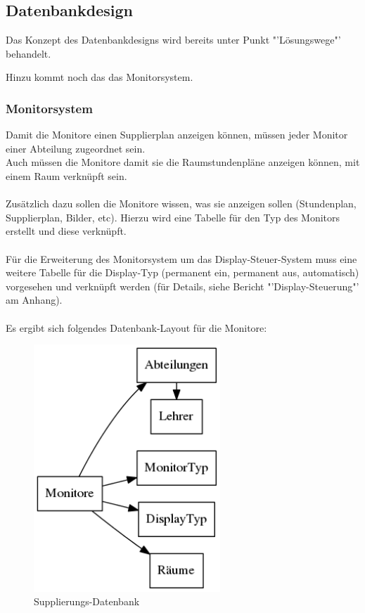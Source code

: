 \subsection{Datenbankdesign}

Das Konzept des Datenbankdesigns wird bereits unter Punkt "'Lösungswege"' behandelt.

Hinzu kommt noch das das Monitorsystem.

\subsubsection{Monitorsystem}

Damit die Monitore einen Supplierplan anzeigen können, müssen jeder Monitor einer Abteilung zugeordnet sein.\\
Auch müssen die Monitore damit sie die Raumstundenpläne anzeigen können, mit einem Raum verknüpft sein.\\
\\
Zusätzlich dazu sollen die Monitore wissen, was sie anzeigen sollen (Stundenplan, Supplierplan, Bilder, etc). Hierzu wird eine Tabelle für den Typ des Monitors erstellt und diese verknüpft.\\
\\ 
Für die Erweiterung des Monitorsystem um das Display-Steuer-System muss eine weitere Tabelle für die Display-Typ (permanent ein, permanent aus, automatisch) vorgesehen und verknüpft werden (für Details, siehe Bericht "'Display-Steuerung"' am Anhang).\\
\\
Es ergibt sich folgendes Datenbank-Layout für die Monitore:
\begin{figure}[H]
\centering
\includegraphics[keepaspectratio=true, width=7cm]{images/dbMonitors.png}
\caption{Supplierungs-Datenbank}
\end{figure}

